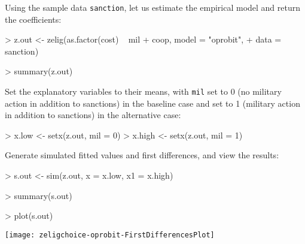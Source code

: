 \documentclass{article}
\begin{document}
\begin{enumerate}
Using the sample data \texttt{sanction}, let us estimate the empirical model and return the coefficients:
\begin{Schunk}
\begin{Sinput}
>  z.out <- zelig(as.factor(cost) ~ mil + coop, model = "oprobit", 
+                  data = sanction)
\end{Sinput}
\end{Schunk}
\begin{Schunk}
\begin{Sinput}
> summary(z.out)
\end{Sinput}
\end{Schunk}
Set the explanatory variables to their means, with {\tt mil} set
to 0 (no military action in addition to sanctions) in the baseline
case and set to 1 (military action in addition to sanctions) in the
alternative case:
\begin{Schunk}
\begin{Sinput}
>  x.low <- setx(z.out, mil = 0)
>  x.high <- setx(z.out, mil = 1)
\end{Sinput}
\end{Schunk}
Generate simulated fitted values and first differences, and view the results:
\begin{Schunk}
\begin{Sinput}
>  s.out <- sim(z.out, x = x.low, x1 = x.high)
\end{Sinput}
\end{Schunk}
\begin{Schunk}
\begin{Sinput}
> summary(s.out)
\end{Sinput}
\end{Schunk}
\begin{center}
\begin{Schunk}
\begin{Sinput}
>  plot(s.out)
\end{Sinput}
\end{Schunk}
\texttt{[image: zeligchoice-oprobit-FirstDifferencesPlot]}
\end{center}
\end{enumerate}
\end{document}
